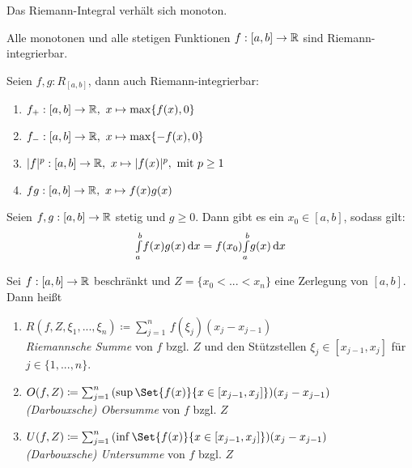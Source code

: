 \documentclass{cheat-sheet}
\begin{document}
\begin{satz}
Das Riemann-Integral verhält sich monoton.
\end{satz}


\begin{satz}
Alle monotonen und alle stetigen Funktionen $f : [a, b] \to \mathbb{R}$ sind Riemann-integrierbar.
\end{satz}

\begin{satz}
Seien $f, g : R_{[a, b]}$, dann auch Riemann-integrierbar:

\begin{enumerate}
  \item $f_{+} : [a, b] \to \mathbb{R},\ x \mapsto \max\{f(x), 0\}$
  \item $f_{-} : [a, b] \to \mathbb{R},\ x \mapsto \max\{-f(x), 0\}$
  \item $|f|^{p} : [a, b] \to \mathbb{R},\ x \mapsto |f(x)|^p, \text{ mit } p \ge 1$
  \item $fg : [a, b] \to \mathbb{R},\ x \mapsto f(x)g(x)$
\end{enumerate}
\end{satz}

\begin{satz}
  Seien $f, g : [a, b] \to \mathbb{R}$ stetig und $g \ge 0$. Dann gibt es ein $x_0 \in [a, b]$, sodass gilt:
  \[ {\textstyle \int\limits_{a}^{b}} f(x)g(x) \,\mathrm{d} x = f(x_0) {\textstyle \int\limits_{a}^{b}} g(x) \,\mathrm{d} x \]
\end{satz}

\begin{defn}
Sei $f : [a, b] \to \mathbb{R}$ beschränkt und $Z = \{ x_0 < ... < x_n \}$ eine Zerlegung von $[a, b]$. Dann heißt

\begin{enumerate}
  \item
    $R(f, Z, \xi_1, ..., \xi_n) \coloneqq \sum_{j=1}^{n}\,f(\xi_j)(x_j - x_{j-1})$\\
    \emph{Riemannsche Summe} von $f$ bzgl. $Z$ und den Stützstellen $\xi_j \in [x_{j-1}, x_j]$ für $j \in \{ 1, ..., n \}$.
  \item
    $O(f, Z) \coloneqq \sum_{j=1}^{n}\,(\sup\Set{f(x)}{x \in [x_{j-1}, x_j]})(x_j - x_{j-1})$\\
    \emph{(Darbouxsche) Obersumme} von $f$ bzgl. $Z$
  \item
    $U(f, Z) \coloneqq \sum_{j=1}^{n}\,(\inf\Set{f(x)}{x \in [x_{j-1}, x_j]})(x_j - x_{j-1})$\\
    \emph{(Darbouxsche) Untersumme} von $f$ bzgl. $Z$
\end{enumerate}
\end{defn}
\end{document}
